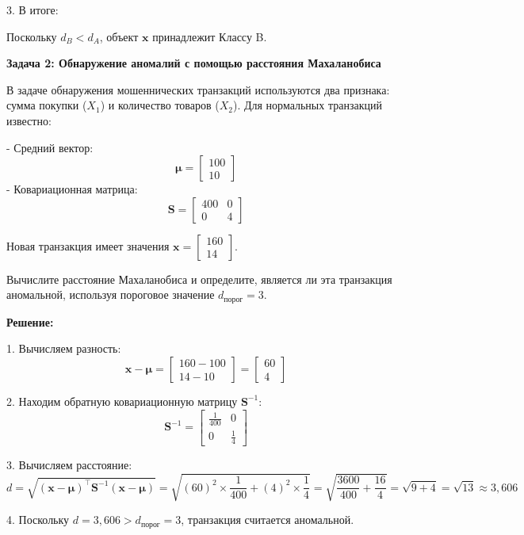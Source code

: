 3. В итоге:

Поскольку \( d_B < d_A \), объект \( \mathbf{x} \) принадлежит Классу B.



\textbf{Задача 2: Обнаружение аномалий с помощью расстояния Махаланобиса}

В задаче обнаружения мошеннических транзакций используются два признака: сумма покупки (\( X_1 \)) и количество товаров (\( X_2 \)). Для нормальных транзакций известно:

- Средний вектор:
  \[
  \mathbf{\mu} = \begin{bmatrix} 100 \\ 10 \end{bmatrix}
  \]
- Ковариационная матрица:
  \[
  \mathbf{S} = \begin{bmatrix} 400 & 0 \\ 0 & 4 \end{bmatrix}
  \]

Новая транзакция имеет значения \( \mathbf{x} = \begin{bmatrix} 160 \\ 14 \end{bmatrix} \).

Вычислите расстояние Махаланобиса и определите, является ли эта транзакция аномальной, используя пороговое значение \( d_{\text{порог}} = 3 \).

\textbf{Решение:}

1. Вычисляем разность:
\[
\mathbf{x} - \mathbf{\mu} = \begin{bmatrix} 160 - 100 \\ 14 - 10 \end{bmatrix} = \begin{bmatrix} 60 \\ 4 \end{bmatrix}
\]

2. Находим обратную ковариационную матрицу \( \mathbf{S}^{-1} \):
\[
\mathbf{S}^{-1} = \begin{bmatrix} \frac{1}{400} & 0 \\ 0 & \frac{1}{4} \end{bmatrix}
\]

3. Вычисляем расстояние:
\[
d = \sqrt{ (\mathbf{x} - \mathbf{\mu})^\top \mathbf{S}^{-1} (\mathbf{x} - \mathbf{\mu}) } = \sqrt{ (60)^2 \times \frac{1}{400} + (4)^2 \times \frac{1}{4} } = \sqrt{ \frac{3600}{400} + \frac{16}{4} } = \sqrt{9 + 4} = \sqrt{13} \approx 3{,}606
\]

4. Поскольку \( d = 3{,}606 > d_{\text{порог}} = 3 \), транзакция считается аномальной.

